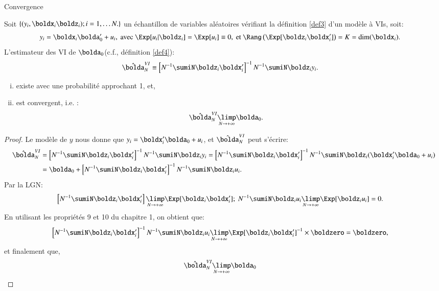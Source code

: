 \begin{frame}[allowframebreaks]{Convergence}
\begin{propriete}
Soit $\{(y_i, \boldx_i \boldz_i); i=1, \ldots N.\}$ un échantillon de variables
aléatoires vérifiant la définition \ref{def3} d'un modèle à VIs, soit: 
\begin{align*}
    y_i &=\boldx_i\bolda_0^\prime + u_i, \ \text{avec} \ \Exp[u_i|\boldz_i] = \Exp[u_i]\equiv 0,
    \ \text{et} \ \Rang\left(\Exp[\boldz_i\boldx_i^\prime]\right)= K = \dim(\boldx_i).
\end{align*}
L’estimateur des VI de $\bolda_0$(c.f., définition \ref{def4}):
\begin{align*}
    \hat{\bolda}_N^{VI}&\equiv \left[N^{-1}\sumiN \boldz_i\boldx_i^\prime \right]^{-1}N^{-1}\sumiN \boldz_iy_i.
\end{align*}
\begin{enumerate}[(i)]
    \item  existe avec une probabilité approchant 1, et,
    \item est convergent, i.e. : 
    \begin{align*}
        \hat{\bolda}_N^{VI} &\underset{N\to +\infty}{\limp} \bolda_0.
    \end{align*}
\end{enumerate}
\end{propriete}

\framebreak

\begin{proof}
\footnotesize 
Le modèle de $y$ nous donne que $y_i =\boldx_i^\prime\bolda_0 +u_i$,  et  $\hat{\bolda}_N^{VI}$ peut s'écrire:
\begin{align*}
    \hat{\bolda}_N^{VI} &= \left[N^{-1}\sumiN \boldz_i\boldx_i^\prime \right]^{-1}N^{-1}\sumiN \boldz_iy_i
    = \left[N^{-1}\sumiN \boldz_i\boldx_i^\prime \right]^{-1}N^{-1}\sumiN \boldz_i(\boldx_i^\prime\bolda_0 +u_i)\\
    &= \bolda_0 + \left[N^{-1}\sumiN \boldz_i\boldx_i^\prime \right]^{-1} N^{-1}\sumiN \boldz_iu_i.
\end{align*}
Par la LGN:
\begin{align*}
    \left[N^{-1}\sumiN \boldz_i\boldx_i^\prime \right] \underset{N\to +\infty}{\limp} \Exp[\boldz_i\boldx_i^\prime]&; \ 
    N^{-1}\sumiN \boldz_iu_i  \underset{N\to +\infty}{\limp} \Exp[\boldz_i u_i] = 0.
\end{align*}
En utilisant les propriétés 9 et 10 du chapitre 1, on obtient que:
\begin{align*}
    \left[N^{-1}\sumiN \boldz_i\boldx_i^\prime \right]^{-1} N^{-1}\sumiN \boldz_iu_i&
    \underset{N\to +\infty}{\limp} \Exp[\boldz_i\boldx_i^\prime]^{-1} \times \boldzero = \boldzero,
\end{align*}
et finalement que, 
\begin{align*}
   \hat{\bolda}_N^{VI}&\underset{N\to +\infty}{\limp} \bolda_0
\end{align*}

\end{proof}

\end{frame}

